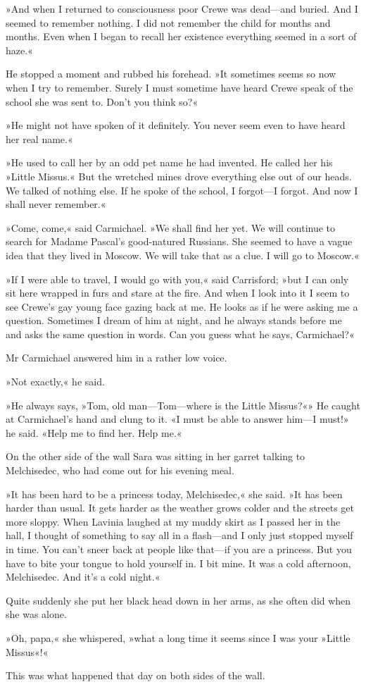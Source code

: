 »And when I returned to consciousness poor Crewe was dead—and buried. And I seemed to remember nothing. I did not remember the child for months and months. Even when I began to recall her existence everything seemed in a sort of haze.«

He stopped a moment and rubbed his forehead. »It sometimes seems so now when I try to remember. Surely I must sometime have heard Crewe speak of the school she was sent to. Don't you think so?«

»He might not have spoken of it definitely. You never seem even to have heard her real name.«

»He used to call her by an odd pet name he had invented. He called her his »Little Missus.« But the wretched mines drove everything else out of our heads. We talked of nothing else. If he spoke of the school, I forgot—I forgot. And now I shall never remember.«

»Come, come,« said Carmichael. »We shall find her yet. We will continue to search for Madame Pascal's good-natured Russians. She seemed to have a vague idea that they lived in Moscow. We will take that as a clue. I will go to Moscow.«

»If I were able to travel, I would go with you,« said Carrisford; »but I can only sit here wrapped in furs and stare at the fire. And when I look into it I seem to see Crewe's gay young face gazing back at me. He looks as if he were asking me a question. Sometimes I dream of him at night, and he always stands before me and asks the same question in words. Can you guess what he says, Carmichael?«

Mr Carmichael answered him in a rather low voice.

»Not exactly,« he said.

»He always says, »Tom, old man—Tom—where is the Little Missus?«» He caught at Carmichael's hand and clung to it. «I must be able to answer him—I must!» he said. «Help me to find her. Help me.«


On the other side of the wall Sara was sitting in her garret talking to Melchisedec, who had come out for his evening meal.

»It has been hard to be a princess today, Melchisedec,« she said. »It has been harder than usual. It gets harder as the weather grows colder and the streets get more sloppy. When Lavinia laughed at my muddy skirt as I passed her in the hall, I thought of something to say all in a flash—and I only just stopped myself in time. You can't sneer back at people like that—if you are a princess. But you have to bite your tongue to hold yourself in. I bit mine. It was a cold afternoon, Melchisedec. And it's a cold night.«

Quite suddenly she put her black head down in her arms, as she often did when she was alone.

»Oh, papa,« she whispered, »what a long time it seems since I was your »Little Missus«!«

This was what happened that day on both sides of the wall.